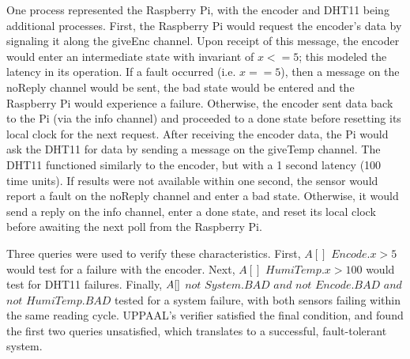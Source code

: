 \documentclass[letterpaper, 12pt]{article}
\begin{document}
\indent One process represented the Raspberry Pi, with the encoder and DHT11 being additional processes.  First, the Raspberry Pi would request the encoder's data by signaling it along the giveEnc channel.  Upon receipt of this message, the encoder would enter an intermediate state with invariant of $x <= 5$; this modeled the latency in its operation.  If a fault occurred (i.e. $x == 5$), then a message on the noReply channel would be sent, the bad state would be entered and the Raspberry Pi would experience a failure.  Otherwise, the encoder sent data back to the Pi (via the info channel) and proceeded to a done state before resetting its local clock for the next request.  After receiving the encoder data, the Pi would ask the DHT11 for data by sending a message on the giveTemp channel.  The DHT11 functioned similarly to the encoder, but with a 1 second latency (100 time units).  If results were not available within one second, the sensor would report a fault on the noReply channel and enter a bad state.  Otherwise, it would send a reply on the info channel, enter a done state, and reset its local clock before awaiting the next poll from the Raspberry Pi.

\indent Three queries were used to verify these characteristics.  First, $A[]$ $Encode.x > 5$ would test for a failure with the encoder.  Next, $A []$ $HumiTemp.x > 100$ would test for DHT11 failures.  Finally, $A[\space]$  $ not $ $System.BAD$ $and $ $not $ $Encode.BAD$ $and$ $not$ $HumiTemp.BAD$ tested for a system failure, with both sensors failing within the same reading cycle.  UPPAAL's verifier satisfied the final condition, and found the first two queries unsatisfied, which translates to a successful, fault-tolerant system.
\end{document}
